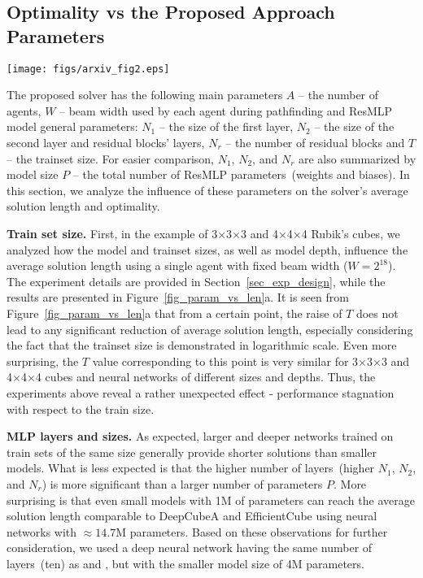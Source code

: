 \subsection{\label{sec_analysis} Optimality vs the Proposed Approach Parameters }

\begin{figure*}[ht]
\centering
\texttt{[image: figs/arxiv\_fig2.eps]}
\caption{Influence of model parameters on solution length for 3$\times$3$\times$3 and 4$\times$4$\times$4 cubes (jitter plot): (a)~influence of the model size, trainset sizes, and model depth on average solution length; (b)~influence of the beam width on average solution length.}\label{fig_param_vs_len}
\end{figure*}

The proposed solver has the following main parameters $A$ -- the number of agents, $W$ -- beam width used by each agent during pathfinding and ResMLP model general parameters: $N_1$ -- the size of the first layer, $N_2$ -- the size of the second layer and residual blocks' layers, $N_r$ -- the number of residual blocks and $T$ -- the trainset size. For easier comparison, $N_1$, $N_2$, and $N_r$ are also summarized by model size $P$ -- the total number of ResMLP parameters~(weights and biases). In this section, we analyze the influence of these parameters on the solver's average solution length and optimality. 


{\bf Train set size.} First, in the example of 3$\times$3$\times$3 and 4$\times$4$\times$4 Rubik's cubes, we analyzed how the model and trainset sizes, as well as model depth, influence the average solution length using a single agent with fixed beam width ($W=2^{18}$). The experiment details are provided in Section~\ref{sec_exp_design}, while the results are presented in Figure~\ref{fig_param_vs_len}a. It is seen from Figure~\ref{fig_param_vs_len}a that from a certain point, the raise of $T$ does not lead to any significant reduction of average solution length, especially considering the fact that the trainset size is demonstrated in logarithmic scale. Even more surprising, the $T$ value corresponding to this point is very similar for 3$\times$3$\times$3 and 4$\times$4$\times$4 cubes and neural networks of different sizes and depths. Thus, the experiments above reveal a rather unexpected effect - performance stagnation with respect to the train size.  

{\bf MLP layers and sizes.} As expected, larger and deeper networks trained on train sets of the same size generally provide shorter solutions than smaller models. What is less expected is that the higher number of layers~(higher $N_1$, $N_2$, and $N_r$) is more significant than a larger number of parameters $P$. More surprising is that even small models with 1M of parameters can reach the average solution length comparable to DeepCubeA and EfficientCube using neural networks with $\approx14.7\mbox{M}$ parameters. Based on these observations for further consideration, we used a deep neural network having the same number of layers~(ten) as \cite{agostinelli2019solving} and \cite{takano2023selfsupervision}, but with the smaller model size of 4M parameters.

